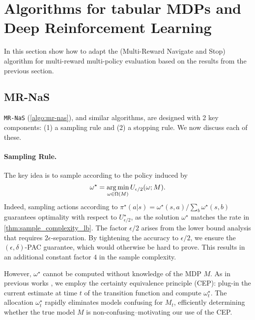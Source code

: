 \section{Algorithms for tabular MDPs and Deep Reinforcement Learning}\label{sec:algorithms}
In this section show how to adapt the \mrnas{} (Multi-Reward Navigate and Stop) algorithm \cite{russomulti}  for multi-reward multi-policy evaluation based on the results from the previous section.

\subsection{MR-NaS}
{\tt MR-NaS} (\cref{algo:mr-nas}), and similar algorithms, are designed with 2 key components: (1) a sampling rule and (2) a stopping rule. We now discuss each of these.

\paragraph{Sampling Rule.} The key idea is to sample according to the policy induced by   \[\omega^\star=\operatorname*{arg\,min}_{\omega\in \Omega(M)} U_{\epsilon/2}(\omega;M).\] Indeed, sampling actions according to $\pi^\star(a|s) = \omega^\star(s,a)/\sum_b \omega^\star(s,b)$ guarantees   optimality with respect to $U_{\epsilon/2}^\star$, as the solution $\omega^\star$  matches the rate in \cref{thm:sample_complexity_lb}. The factor $\epsilon/2$ arises from  the lower bound analysis that requires $2\epsilon$-separation. By tightening the  accuracy to  $\epsilon/2$, we ensure the $(\epsilon,\delta)$-PAC guarantee,  which  would otherwise be hard to prove. This results in an additional constant factor $4$ in the sample complexity.

However, $\omega^\star$ cannot be computed without knowledge of the MDP $M$. As in previous works \cite{garivier2016optimal,al2021navigating}, we employ the certainty equivalence principle (CEP): plug-in the current estimate at time $t$ of the transition function   and compute  $\omega_t^\star$. The allocation $\omega_t^\star$ rapidly eliminates models confusing for $M_t$, efficiently determining whether the true model $M$ is non-confusing--motivating our use of the CEP.



